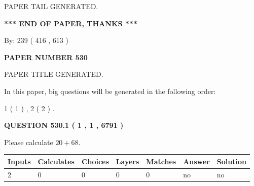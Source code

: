 \documentclass[12pt]{article}
\begin{document}
   
   
   
   
   
 \vspace{0.2in}
 
   
   
\vspace{2.0in} PAPER TAIL GENERATED.
   
   
   
   
\vspace{1.0in} 
{\textbf{\large{ *** END OF PAPER, THANKS *** }}} 
   
   
\hspace{1.0in} By: 
 239 ( 416 ,  613 )
   
   
   
   
\newpage 
\setcounter{page}{ 
   530001 } 
   
   
   
   
 {\textbf{ \Large{ PAPER NUMBER  530  }}}
   
   
\vspace{0.2in}
   
   
   
   
   
   
   
   
 \vspace{0.2in}
 
 
 
 
   
   
 PAPER TITLE GENERATED.
   
   
   
\vspace{0.2in}
   
In this paper, big questions will be generated in the following order: 
   
   
   1 ( 1 )
 ,
   2 ( 2 )
 .
  
\vspace{0.2in}
  
{\textbf{\Large{QUESTION
530.1 
 ( 1 , 1 , 6791 )
}}}
  
  
 
Please calculate $ %
20 +  %
68 $.
 
 
   
   
   
   
\noindent\begin{tabular}{|l|l|l|l|l|l|l|}
 \hline
Inputs & Calculates & Choices & Layers & Matches & Answer & Solution \\ \hline
 2  & 
 0  & 
 0
  & 
 0  & 
 0  & 
  no & 
  no 
  \\ \hline
 \end{tabular}
   
\end{document}
